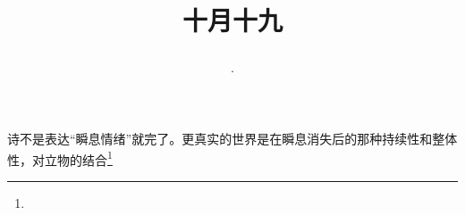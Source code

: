 \title{\date[d=19,m=11,y=2024][year:cn-y,年,month:cn,day:cn,日,·,weekday]·十月十九 }
诗不是表达“瞬息情绪”就完了。更真实的世界是在瞬息消失后的那种持续性和整体性，对立物的结合\footnote{ }

